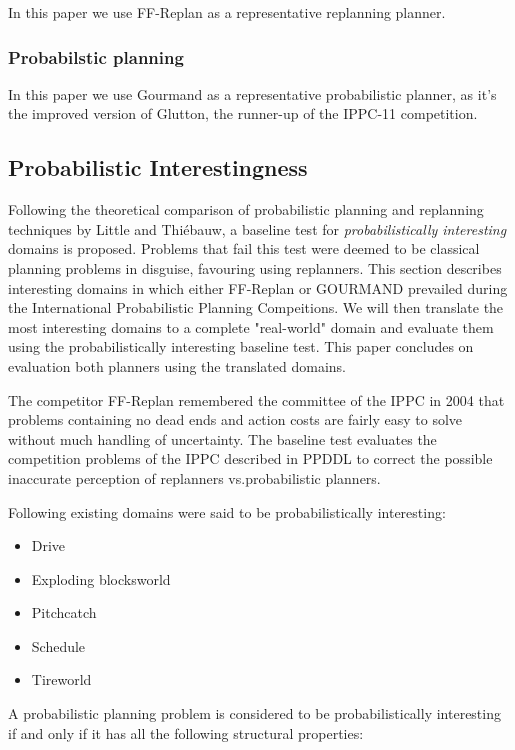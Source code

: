 \documentclass[runningheads,a4paper]{llncs}
\begin{document}
In this paper we use FF-Replan as a representative replanning planner.

\subsubsection{Probabilstic planning}
In this paper we use Gourmand as a representative probabilistic planner, as
it's the improved version of Glutton, the runner-up of the IPPC-11 competition.

\subsection{Probabilistic Interestingness}

Following the theoretical comparison of probabilistic planning and replanning techniques by Little and Thi\'ebauw, a baseline test for \emph{probabilistically interesting} domains is proposed. Problems that fail this test were deemed to be classical planning problems in disguise, favouring using replanners\cite{little2007probvsreplan}. This section describes interesting domains in which either FF-Replan or GOURMAND prevailed during the International Probabilistic Planning Compeitions. We will then translate the most interesting domains to a complete "real-world" domain and evaluate them using the probabilistically interesting baseline test. This paper concludes on evaluation both planners using the translated domains.

The competitor FF-Replan\cite{FFReplan} remembered the committee of the IPPC in 2004 that problems containing no dead ends and action costs are fairly easy to solve without much handling of uncertainty. The baseline test evaluates the competition problems of the IPPC described in PPDDL to correct the possible inaccurate perception of replanners vs.\@ probabilistic planners.

Following existing domains were said to be probabilistically interesting:

\begin{itemize}
	\item Drive
	\item Exploding blocksworld
	\item Pitchcatch
	\item Schedule
	\item Tireworld
\end{itemize}

A probabilistic planning problem is considered to be probabilistically interesting if and only if it has all the following structural properties:
\end{document}
